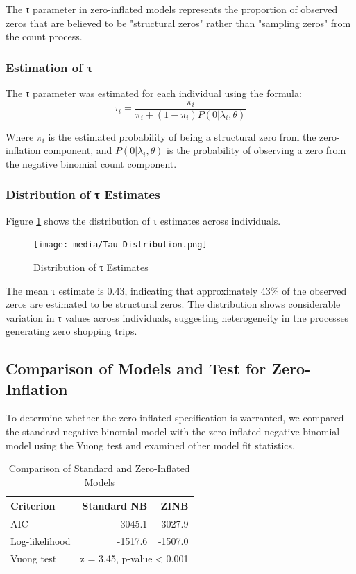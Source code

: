 \documentclass[12pt]{article}
\begin{document}
The τ parameter in zero-inflated models represents the proportion of observed zeros that are believed to be "structural zeros" rather than "sampling zeros" from the count process.

\subsubsection{Estimation of τ}

The τ parameter was estimated for each individual using the formula:
$$\tau_i = \frac{\pi_i}{\pi_i + (1-\pi_i)P(0|\lambda_i,\theta)}$$

Where $\pi_i$ is the estimated probability of being a structural zero from the zero-inflation component, and $P(0|\lambda_i,\theta)$ is the probability of observing a zero from the negative binomial count component.

\subsubsection{Distribution of τ Estimates}

Figure \ref{fig:tau_distribution} shows the distribution of τ estimates across individuals.

\begin{figure}[H]
\centering
\texttt{[image: media/Tau Distribution.png]}
\caption{Distribution of τ Estimates}
\label{fig:tau_distribution}
\end{figure}

The mean τ estimate is 0.43, indicating that approximately 43\% of the observed zeros are estimated to be structural zeros. The distribution shows considerable variation in τ values across individuals, suggesting heterogeneity in the processes generating zero shopping trips.

\subsection{Comparison of Models and Test for Zero-Inflation}

To determine whether the zero-inflated specification is warranted, we compared the standard negative binomial model with the zero-inflated negative binomial model using the Vuong test and examined other model fit statistics.

\begin{table}[h]
\centering
\caption{Comparison of Standard and Zero-Inflated Models}
\label{tab:model_comp}
\begin{tabular}{lrr}
\toprule
Criterion & Standard NB & ZINB \\
\midrule
AIC & 3045.1 & 3027.9 \\
Log-likelihood & -1517.6 & -1507.0 \\
Vuong test & \multicolumn{2}{c}{z = 3.45, p-value < 0.001} \\
\bottomrule
\end{tabular}
\end{table}
\end{document}
